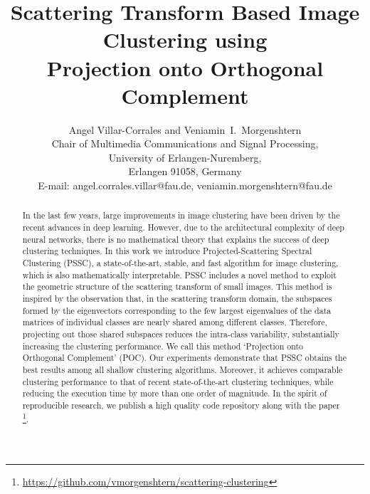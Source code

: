 \documentclass[11pt]{article}
\theoremstyle{definition}
\begin{document}
\title{Scattering Transform Based Image Clustering using \\ Projection onto Orthogonal Complement}





\author{
	\parbox{\linewidth}{\centering
		Angel Villar-Corrales and Veniamin~I.~Morgenshtern\\\vspace{0.3cm}
		Chair of Multimedia Communications and Signal Processing,\\ University of Erlangen-Nuremberg,\\ 
		Erlangen 91058, Germany\\
		E-mail: angel.corrales.villar@fau.de, veniamin.morgenshtern@fau.de
	}
}



\maketitle



\begin{abstract}
	
	
	In the last few years, large improvements in image clustering have been driven by the recent advances in deep
	learning. However, due to the architectural complexity of deep neural networks, there is no mathematical theory that explains
	the success of deep clustering techniques.
	In this work we introduce Projected-Scattering Spectral Clustering (PSSC), a state-of-the-art, stable, and fast algorithm for image  clustering, 
	which is also mathematically interpretable. 
	PSSC includes a novel method to exploit the geometric structure of the scattering transform of small images.
	This method is inspired by the observation that, in the scattering transform domain, the subspaces formed by the eigenvectors corresponding to the few largest eigenvalues  of the data matrices of individual classes are nearly shared among different classes. 
	Therefore, projecting out those shared subspaces reduces the intra-class variability, substantially increasing the clustering performance.
	We call this method ‘Projection onto Orthogonal Complement’ (POC).
	Our experiments demonstrate that PSSC obtains the best results among all shallow clustering algorithms. Moreover,
	it achieves comparable clustering performance to that of recent state-of-the-art clustering techniques, while reducing the execution time by more than one order of magnitude. In the spirit of reproducible research, 
	we publish a high quality code repository along with the paper \footnote{\url{https://github.com/vmorgenshtern/scattering-clustering}}.
		
	
\end{abstract}
\end{document}
